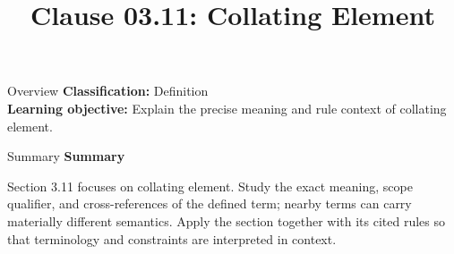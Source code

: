 \documentclass[10pt,letterpaper]{article}
\title{Clause 03.11: Collating Element}
\author{}
\date{}
\begin{document}
\maketitle
\begin{CornellOverviewBox}{Overview}
\textbf{Classification:} Definition\\[2pt]
\textbf{Learning objective:} Explain the precise meaning and rule context of collating element.
\end{CornellOverviewBox}\begin{CornellSummaryBox}{Summary}
{\sffamily\bfseries\color{Accent} Summary}\par\vspace{3pt}Section 3.11 focuses on collating element. Study the exact meaning, scope qualifier, and cross-references of the defined term; nearby terms can carry materially different semantics. Apply the section together with its cited rules so that terminology and constraints are interpreted in context.
\end{CornellSummaryBox}
\end{document}
